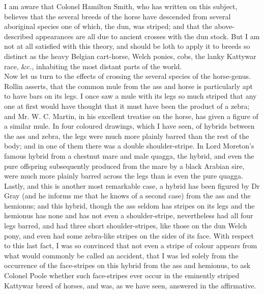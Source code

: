 \indent I am aware that Colonel Hamilton Smith, who has written on this subject, believes that the several breeds of the horse have descended from several aboriginal species one of which, the dun, was striped; and that the above-described appearances are all due to ancient crosses with the dun stock. But I am not at all satisfied with this theory, and should be loth to apply it to breeds so distinct as the heavy Belgian cart-horse, Welch ponies, cobs, the lanky Kattywar race, \&c., inhabiting the most distant parts of the world.\\
\indent Now let us turn to the effects of crossing the several species of the horse-genus. Rollin asserts, that the common mule from the ass and horse is particularly apt to have bars on its legs. I once saw a mule with its legs so much striped that any one at first would have thought that it must have been the product of a zebra; and Mr. W. C. Martin, in his excellent treatise on the horse, has given a figure of a similar mule. In four coloured drawings, which I have seen, of hybrids between the ass and zebra, the legs were much more plainly barred than the rest of the body; and in one of them there was a double shoulder-stripe. In Lord Moreton's famous hybrid from a chestnut mare and male quagga, the hybrid, and even the pure offspring subsequently produced from the mare by a black Arabian sire, were much more plainly barred across the legs than is even the pure quagga. Lastly, and this is another most remarkable case, a hybrid has been figured by Dr Gray (and he informs me that he knows of a second case) from the ass and the hemionus; and this hybrid, though the ass seldom has stripes on its legs and the hemionus has none and has not even a shoulder-stripe, nevertheless had all four legs barred, and had three short shoulder-stripes, like those on the dun Welch pony, and even had some zebra-like stripes on the sides of its face. With respect to this last fact, I was so convinced that not even a stripe of colour appears from what would commonly be called an accident, that I was led solely from the occurrence of the face-stripes on this hybrid from the ass and hemionus, to ask Colonel Poole whether such face-stripes ever occur in the eminently striped Kattywar breed of horses, and was, as we have seen, answered in the affirmative.\\
